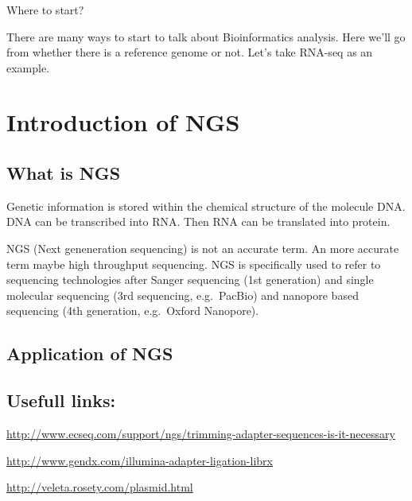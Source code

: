 \documentclass[]{book}
\theoremstyle{definition}
\theoremstyle{definition}
\theoremstyle{definition}
\theoremstyle{remark}
\begin{document}
\subsection{}\label{section-3}

Where to start?

There are many ways to start to talk about Bioinformatics analysis. Here
we'll go from whether there is a reference genome or not. Let's take
RNA-seq as an example.

\chapter{Introduction of NGS}\label{introduction-of-ngs}

\section{What is NGS}\label{what-is-ngs}

Genetic information is stored within the chemical structure of the
molecule DNA. DNA can be transcribed into RNA. Then RNA can be
translated into protein.

NGS (Next geneneration sequencing) is not an accurate term. An more
accurate term maybe high throughput sequencing. NGS is specifically used
to refer to sequencing technologies after Sanger sequencing (1st
generation) and single molecular sequencing (3rd sequencing,
e.g.~PacBio) and nanopore based sequencing (4th generation, e.g.~Oxford
Nanopore).

\section{Application of NGS}\label{application-of-ngs}

\section{}\label{section-4}

\section{Usefull links:}\label{usefull-links}

\url{http://www.ecseq.com/support/ngs/trimming-adapter-sequences-is-it-necessary}

\url{http://www.gendx.com/illumina-adapter-ligation-librx}

\url{http://veleta.rosety.com/plasmid.html}
\end{document}
